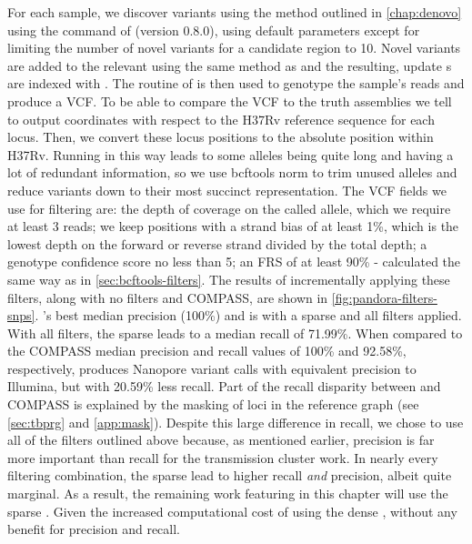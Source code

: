 For each sample, we discover \denovo{} variants using the method outlined in \autoref{chap:denovo} using the  command of \pandora{} (version 0.8.0), using default parameters except for limiting the number of novel variants for a candidate region to 10. Novel variants are added to the relevant \prg{} using the same method as  and the resulting, update \prg{}s are indexed with \pandora{}. The  routine of \pandora{} is then used to genotype the sample's reads and produce a VCF. To be able to compare the \pandora{} VCF to the truth assemblies we tell \pandora{} to output coordinates with respect to the H37Rv reference sequence for each locus. Then, we convert these locus positions to the absolute position within H37Rv. Running \pandora{} in this way leads to some alleles being quite long and having a lot of redundant information, so we use bcftools norm to trim unused alleles and reduce variants down to their most succinct representation.
The \pandora{} VCF fields we use for filtering are: the depth of coverage on the called allele, which we require at least 3 reads; we keep positions with a strand bias of at least 1\%, which is the lowest depth on the forward or reverse strand divided by the total depth; a genotype confidence score no less than 5; an FRS of at least 90\%  - calculated the same way as in \autoref{sec:bcftools-filters}.
The results of incrementally applying these filters, along with no filters and COMPASS, are shown in \autoref{fig:pandora-filters-snps}. \pandora{}'s best median precision (100\%) and
is with a sparse \prg{} and all filters applied. With all filters, the sparse \prg{} leads to a median recall of 71.99\%. When compared to the COMPASS median precision and recall values
of 100\% and 92.58\%, respectively, \pandora{} produces Nanopore variant calls
with equivalent precision to Illumina, but with 20.59\% less recall. Part of the recall disparity between \pandora{} and COMPASS is explained by the masking of loci in the reference graph (see \autoref{sec:tbprg} and \autoref{app:mask}). Despite this large difference in recall, we chose to use all of the filters outlined above because, as mentioned earlier, precision is far more important than recall for the transmission cluster work.
In nearly every filtering combination, the sparse \prg{} lead to higher recall \emph{and} precision, albeit quite marginal. As a result, the remaining work featuring \pandora{} in this chapter will use the sparse \prg{}. Given the increased computational cost of using the dense \prg{}, without any benefit for precision and recall.


